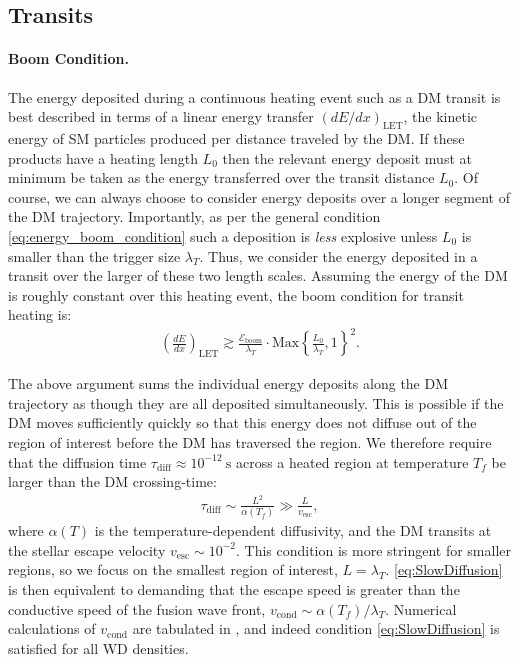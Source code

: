 \documentclass[preprintnumbers,amsmath,amssymb,prd,superscriptaddress]{revtex4}
\newcommand{\Eboom}{\mathcal{E}_\text{boom}}
\begin{document}

\subsection{Transits}

\paragraph{Boom Condition.}
The energy deposited during a continuous heating event such as a DM transit is best described in terms of a linear energy transfer $(dE/dx)_\text{LET}$, the kinetic energy of SM particles produced per distance traveled by the DM.
If these products have a heating length $L_0$ then the relevant energy deposit must at minimum be taken as the energy transferred over the transit distance $L_0$.
Of course, we can always choose to consider energy deposits over a longer segment of the DM trajectory.
Importantly, as per the general condition \eqref{eq:energy_boom_condition} such a deposition is \emph{less} explosive unless $L_0$ is smaller than the trigger size $\lambda_T$.
Thus, we consider the energy deposited in a transit over the larger of these two length scales.
Assuming the energy of the DM is roughly constant over this heating event, the boom condition for transit heating is:
\begin{align}
\label{eq:transitexplosion}
  \left( \frac{d E}{d x} \right)_\text{LET} \gtrsim
  \frac{\Eboom}{\lambda_T} \cdot \text{Max}
  \left\{\frac{L_0}{\lambda_T}, 1 \right\}^2.
\end{align}

The above argument sums the individual energy deposits along the DM trajectory as though they are all deposited simultaneously.
This is possible if the DM moves sufficiently quickly so that this energy does not diffuse out of the region of interest before the DM has traversed the region.
We therefore require that the diffusion time $\tau_\text{diff} \approx 10^{-12} ~\text{s}$ across a heated region at temperature $T_f$ be larger than the DM crossing-time:
\begin{align}
  \tau_\text{diff} \sim \frac{L^2}{\alpha(T_f)} \gg
  \frac{L}{v_\text{esc}},
\label{eq:SlowDiffusion}
\end{align}
where $\alpha(T)$ is the temperature-dependent diffusivity, and the DM transits at the stellar escape velocity $v_\text{esc} \sim 10^{-2}$.
This condition is more stringent for smaller regions, so we focus on the smallest region of interest, $L = \lambda_T$.
\eqref{eq:SlowDiffusion} is then equivalent to demanding that the escape speed is greater than the conductive speed of the fusion wave front, $v_\text{cond} \sim \alpha(T_f) / \lambda_T$.
Numerical calculations of $v_\text{cond}$ are tabulated in \cite{Woosley}, and indeed condition \eqref{eq:SlowDiffusion} is satisfied for all WD densities.
\end{document}
